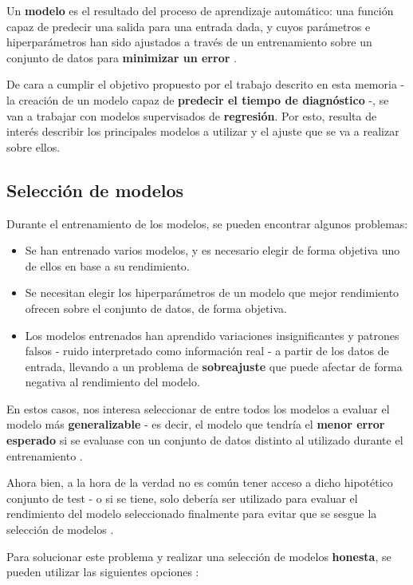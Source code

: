 Un \textbf{modelo} es el resultado del proceso de aprendizaje automático: una función capaz de predecir una salida para una entrada dada, y cuyos parámetros e hiperparámetros han sido ajustados a través de un entrenamiento sobre un conjunto de datos para \textbf{minimizar un error} \cite{Burkov2019TheHM}. 

De cara a cumplir el objetivo propuesto por el trabajo descrito en esta memoria - la creación de un modelo capaz de \textbf{predecir el tiempo de diagnóstico} -, se van a trabajar con modelos supervisados de \textbf{regresión}. Por esto, resulta de interés describir los principales modelos a utilizar y el ajuste que se va a realizar sobre ellos.

\subsection{Selección de modelos}

Durante el entrenamiento de los modelos, se pueden encontrar algunos problemas:
\begin{itemize}
	\item Se han entrenado varios modelos, y es necesario elegir de forma objetiva uno de ellos en base a su rendimiento.
	\item Se necesitan elegir los hiperparámetros de un modelo que mejor rendimiento ofrecen sobre el conjunto de datos, de forma objetiva.
	\item Los modelos entrenados han aprendido variaciones insignificantes y patrones falsos - ruido interpretado como información real - a partir de los datos de entrada, llevando a un problema de \textbf{sobreajuste} \cite{mlprobabilistic} que puede afectar de forma negativa al rendimiento del modelo.
\end{itemize}

En estos casos, nos interesa seleccionar de entre todos los modelos a evaluar el modelo más \textbf{generalizable} - es decir, el modelo que tendría el \textbf{menor error esperado} si se evaluase con un conjunto de datos distinto al utilizado durante el entrenamiento \cite{mlprobabilistic}. 

Ahora bien, a la hora de la verdad no es común tener acceso a dicho hipotético conjunto de test - o si se tiene, solo debería ser utilizado para evaluar el rendimiento del modelo seleccionado finalmente para evitar que se sesgue la selección de modelos \cite{aima}. 

Para solucionar este problema y realizar una selección de modelos \textbf{honesta}, se pueden utilizar las siguientes opciones \cite{mlprobabilistic}:

